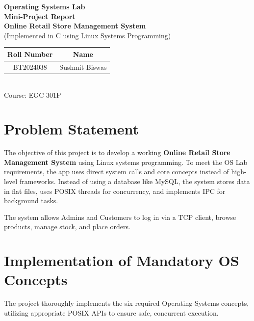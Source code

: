 \documentclass[12pt,a4paper]{article}
\begin{document}
\vspace*{3cm}
\begin{center}
    {\Huge \textbf{Operating Systems Lab}} \\[1cm]
    {\LARGE \textbf{Mini-Project Report}} \\[2.5cm]
    
    {\Large \textbf{Online Retail Store Management System}} \\[0.5cm]
    {\large (Implemented in C using Linux Systems Programming)} \\[2.5cm]
    
    \renewcommand{\arraystretch}{1.5}
    \begin{tabular}{|c|c|}
        \hline
        \textbf{Roll Number} & \textbf{Name} \\ \hline
        BT2024038 & Sushmit Biswas \\ \hline
    \end{tabular} \\[0.5cm]
    
    {\large Course: EGC 301P}
\end{center}

\newpage

\section{Problem Statement}
The objective of this project is to develop a working \textbf{Online Retail Store Management System} using Linux systems programming. To meet the OS Lab requirements, the app uses direct system calls and core concepts instead of high-level frameworks. Instead of using a database like MySQL, the system stores data in flat files, uses POSIX threads for concurrency, and implements IPC for background tasks.

The system allows Admins and Customers to log in via a TCP client, browse products, manage stock, and place orders.

\vspace{0.5cm}
\section{Implementation of Mandatory OS Concepts}
The project thoroughly implements the six required Operating Systems concepts, utilizing appropriate POSIX APIs to ensure safe, concurrent execution.
\end{document}
